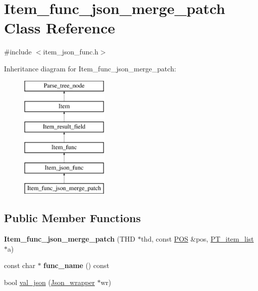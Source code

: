 \hypertarget{classItem__func__json__merge__patch}{}\section{Item\+\_\+func\+\_\+json\+\_\+merge\+\_\+patch Class Reference}
\label{classItem__func__json__merge__patch}


{\ttfamily \#include $<$item\+\_\+json\+\_\+func.\+h$>$}

Inheritance diagram for Item\+\_\+func\+\_\+json\+\_\+merge\+\_\+patch\+:\begin{figure}[H]
\begin{center}
\leavevmode
\includegraphics[height=6.000000cm]{classItem__func__json__merge__patch}
\end{center}
\end{figure}
\subsection*{Public Member Functions}
\begin{DoxyCompactItemize}
\item 
\mbox{\label{classItem__func__json__merge__patch_a3c6ae733a2941e7ab2973d9ca7275f78}} 
{\bfseries Item\+\_\+func\+\_\+json\+\_\+merge\+\_\+patch} (T\+HD $\ast$thd, const \mbox{\hyperlink{structYYLTYPE}{P\+OS}} \&pos, \mbox{\hyperlink{classPT__item__list}{P\+T\+\_\+item\+\_\+list}} $\ast$a)
\item 
\mbox{\label{classItem__func__json__merge__patch_a4c786f97f1ad84ca9f79fde84e699d7f}} 
const char $\ast$ {\bfseries func\+\_\+name} () const
\item 
bool \mbox{\hyperlink{classItem__func__json__merge__patch_a6f64e1bc4bc2fc67ecf0d00a96b74a2c}{val\+\_\+json}} (\mbox{\hyperlink{classJson__wrapper}{Json\+\_\+wrapper}} $\ast$wr)
\end{DoxyCompactItemize}
